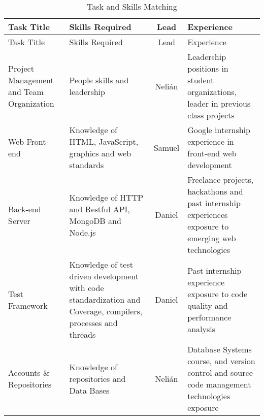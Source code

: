 \label{sec:skills}

\begin{center}
\setlength{\extrarowheight}{1.5pt}
  \begin{longtable}{|m{3cm}|m{5cm}|c|m{5cm}|}
 \caption{Task and Skills Matching} \\
   \hline
  
  \centering Task Title & Skills Required & Lead & Experience \\
  \hline \hline \endfirsthead
  
     \hline

	\centering Task Title & Skills Required & Lead & Experience \\  
	\hline \hline \endhead
  
  \endfoot  
  
  Project Management and Team Organization & People skills and leadership & Nelián & Leadership positions in student organizations, leader in previous class projects\\ \hline
  Web Front-end & Knowledge of HTML, JavaScript, graphics and web standards & Samuel & Google internship experience in front-end web development\\ \hline
  Back-end Server & Knowledge of HTTP and Restful API, MongoDB and Node.js & Daniel & Freelance projects, hackathons and past internship experiences exposure to emerging web technologies \\ \hline
  Test Framework & Knowledge of test driven development with code standardization and Coverage, compilers, processes and threads & Daniel & Past internship experience exposure to code quality and performance analysis\\ \hline
  Accounts \& Repositories & Knowledge of repositories and Data Bases & Nelián & Database Systems course, and version control and source code management
technologies exposure\\ \hline
   \end{longtable}
\end{center}